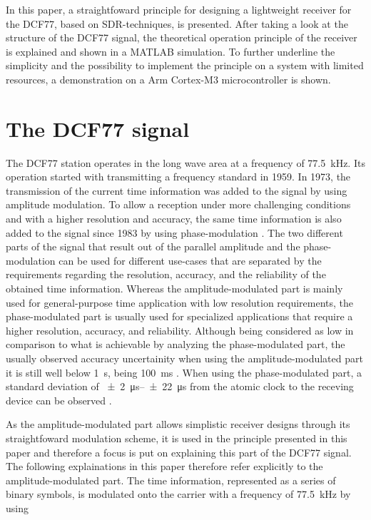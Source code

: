\documentclass[conference]{IEEEtran}
\begin{document}
In this paper, a straightfoward principle for designing a lightweight receiver for the DCF77, based on SDR-techniques, is presented.
After taking a look at the structure of the DCF77 signal, the theoretical operation principle of the receiver is explained and shown in a MATLAB simulation.
To further underline the simplicity and the possibility to implement the principle on a system with limited resources, a demonstration on a Arm Cortex-M3 microcontroller
is shown.

\section{The DCF77 signal}
The DCF77 station operates in the long wave area at a frequency of \SI{77.5}{\kilo\hertz}.
Its operation started with transmitting a frequency standard in 1959.
In 1973, the transmission of the current time information was added to the signal by using amplitude modulation.
To allow a reception under more challenging conditions and with a higher resolution and accuracy, the same time information is also added to the signal since 1983 by using phase-modulation \cite{b3}.
The two different parts of the signal that result out of the parallel amplitude and the phase-modulation can be used for different use-cases that are separated by the
requirements regarding the resolution, accuracy, and the reliability of the obtained time information. 
Whereas the amplitude-modulated part is mainly used for general-purpose time application with low resolution requirements, the phase-modulated part is usually used
for specialized applications that require a higher resolution, accuracy, and reliability.
Although being considered as low in comparison to what is achievable by analyzing the phase-modulated part, the usually observed accuracy uncertainity when using the
amplitude-modulated part it is still well below \SI{1}{\second}, being \SI{100}{\milli\second} \cite{b2}.
When using the phase-modulated part, a standard deviation of \SIrange{\pm 2}{\pm 22}{\micro\second} from the atomic clock to the receving device can be observed \cite{b4}.
\par
As the amplitude-modulated part allows simplistic receiver designs through its straightfoward modulation scheme, it is used in the principle presented in this paper
and therefore a focus is put on explaining this part of the DCF77 signal. The following explainations in this paper therefore refer explicitly to the amplitude-modulated part.
The time information, represented as a series of binary symbols, is modulated onto the carrier with a frequency of \SI{77.5}{\kilo\hertz} by using
\end{document}
